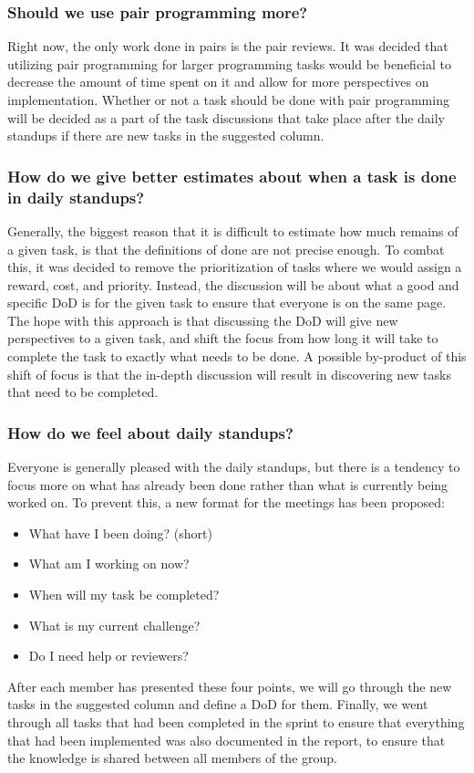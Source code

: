\subsubsection{Should we use pair programming more?}
Right now, the only work done in pairs is the pair reviews.
It was decided that utilizing pair programming for larger programming tasks would be beneficial to decrease the amount of time spent on it and allow for more perspectives on implementation.
Whether or not a task should be done with pair programming will be decided as a part of the task discussions that take place after the daily standups if there are new tasks in the suggested column.

\subsubsection{How do we give better estimates about when a task is done in daily standups?}
Generally, the biggest reason that it is difficult to estimate how much remains of a given task, is that the definitions of done are not precise enough.
To combat this, it was decided to remove the prioritization of tasks where we would assign a reward, cost, and priority.
Instead, the discussion will be about what a good and specific DoD is for the given task to ensure that everyone is on the same page.
The hope with this approach is that discussing the DoD will give new perspectives to a given task, and shift the focus from how long it will take to complete the task to exactly what needs to be done.
A possible by-product of this shift of focus is that the in-depth discussion will result in discovering new tasks that need to be completed.

\subsubsection{How do we feel about daily standups?}
Everyone is generally pleased with the daily standups, but there is a tendency to focus more on what has already been done rather than what is currently being worked on.
To prevent this, a new format for the meetings has been proposed:

\begin{itemize}
	\item{What have I been doing? (short)}
	\item{What am I working on now?}
	\item{When will my task be completed?}
	\item{What is my current challenge?}
	\item{Do I need help or reviewers?}
\end{itemize}

After each member has presented these four points, we will go through the new tasks in the suggested column and define a DoD for them.
Finally, we went through all tasks that had been completed in the sprint to ensure that everything that had been implemented was also documented in the report, to ensure that the knowledge is shared between all members of the group.

